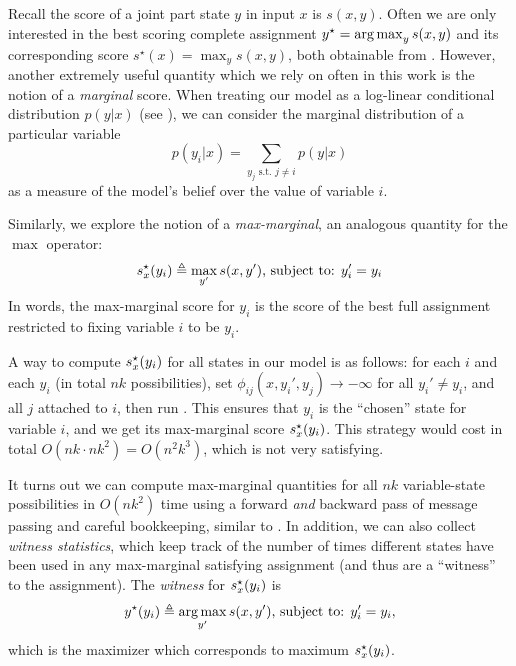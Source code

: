 Recall the score  of a joint part state $y$ in input $x$ is $s(x,y)$. Often we
are only interested in the best scoring complete assignment $y^\star = 
\mathop{\arg\max}_y s(x,y)$ and its corresponding score $s^\star(x) = \max_y s(x,y)$, 
both obtainable from .  However, another extremely useful 
quantity which we rely on often in this work is the notion of a {\em marginal} 
score.  When treating our model as a log-linear conditional distribution 
$p(y|x)$ (see ), we can consider the marginal distribution 
of a particular variable
\begin{equation}
p(y_i|x) = \sum_{y_j \text{ s.t. } j \neq i} p(y|x)
\end{equation}
as a measure of the model's belief over the value of variable $i$.  

Similarly, we explore the notion of a {\em max-marginal}, an analogous quantity 
for the $\max$ operator:
\begin{align}
s^\star_x(y_i) \triangleq  \max_{y'} s(x,y') \text{, subject to: } y_i' = y_i
 \end{align}
In words, the max-marginal score for $y_i$ is the score of the best full 
assignment restricted to fixing variable $i$ to be $y_i$. 

A \naive way to compute $s^\star_x(y_i)$ for all states in our model is as follows: for 
each $i$ and each $y_i$ (in total $nk$ possibilities), set 
$\phi_{ij}(x,y_i',y_j) \rightarrow -\infty$ for all $y_i' \neq y_i$, and all 
$j$ attached to $i$, then run .  This ensures that $y_i$ 
is the ``chosen'' state for variable $i$, and we get its max-marginal score 
$s^\star_x(y_i)$.  This strategy would cost in total $O(nk \cdot nk^2) = O(n^2k^3)$, 
which is not very satisfying.

It turns out we can compute max-marginal quantities for all $nk$ variable-state 
possibilities in $O(nk^2)$ time using a forward {\em and } backward pass of 
message passing and careful bookkeeping, similar to .  In 
addition, we can also collect {\em witness statistics}, which keep track of the 
number of times different states have been used in any max-marginal satisfying 
assignment (and thus are a ``witness'' to the assignment).  The {\em witness} 
for $s^\star_x(y_i)$ is 
\begin{equation}
y^\star(y_i) \triangleq  \mathop{\arg\max}_{y'} s(x,y') \text{, subject to: } y_i' = y_i,
\end{equation}
which is the maximizer which corresponds to maximum $s^\star_x(y_i)$.  


